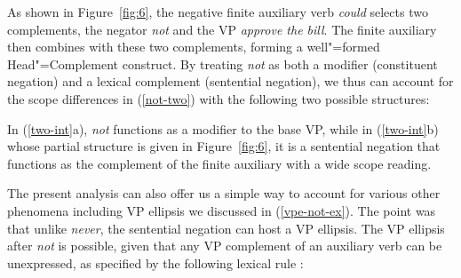 \documentclass[output=paper
                ,modfonts
                		,nonflat
	        ,collection
	        ,collectionchapter
	        ,collectiontoclongg
 	        ,biblatex
                ,babelshorthands
                ,newtxmath
                ,draftmode
                ,colorlinks, citecolor=brown
]{./langsci/langscibook}
\begin{document}
{\begin{exe}
\begin{xlist}
\begin{exe}
\begin{xlist}
As shown in Figure~\ref{fig:6}, the negative finite auxiliary verb \textit{could} selects two complements, the negator
\textit{not} and the VP \textit{approve the bill}. The finite auxiliary then
combines with these two complements, forming a well"=formed Head"=Complement construct.
By treating \textit{not} as both a modifier (constituent negation)
and a lexical complement (sentential negation), we thus can
account for the scope differences in (\ref{not-two}) with the
following two possible structures:

\eal
\label{two-int}
\zl
%
In (\ref{two-int}a), \textit{not} functions as a modifier to
the base VP, while  in (\ref{two-int}b) whose partial structure is
given in Figure~\ref{fig:6}, it is a sentential
negation that functions as the complement of the finite auxiliary
with a wide scope reading.

The present analysis can also offer us
a simple way to account for various other phenomena
including VP ellipsis we discussed in (\ref{vpe-not-ex}). The point
was that unlike \textit{never}, the sentential negation can
host a VP ellipsis.  The VP ellipsis after \textit{not} is
possible, given that any VP complement of an auxiliary
verb can be unexpressed, as
specified by the following lexical rule \citep{kim:00}:



\end{xlist}
\end{exe}
\end{xlist}
\end{exe}}
\end{document}
